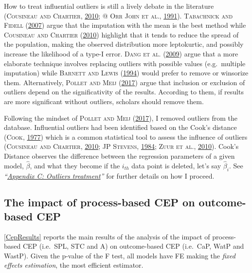 \documentclass[12pt,]{article}
\begin{document}
How to treat influential outliers is still a lively debate in the
literature (\textsc{Cousineau and Chartier},
\protect\hyperlink{ref-Cousineau2010}{2010}; @ \textsc{Orr John et al.},
\protect\hyperlink{ref-OrrJohn1991}{1991}). \textsc{Tabachnick and
Fidell} (\protect\hyperlink{ref-Tabachnick2007}{2007}) argue that the
imputation with the mean is the best method while \textsc{Cousineau and
Chartier} (\protect\hyperlink{ref-Cousineau2010}{2010}) highlight that
it tends to reduce the spread of the population, making the observed
distribution more leptokurtic, and possibly increase the likelihood of a
type-I error. \textsc{Dang et al.}
(\protect\hyperlink{ref-Dang2009}{2009}) argue that a more elaborate
technique involves replacing outliers with possible values
(e.g.~multiple imputation) while \textsc{Barnett and Lewis}
(\protect\hyperlink{ref-Barnett1994}{1994}) would prefer to remove or
winsorize them. Alternatively, \textsc{Pollet and Meij}
(\protect\hyperlink{ref-Pollet2017}{2017}) argue that inclusion or
exclusion of outliers depend on the significativity of the results.
According to them, if results are more significant without outliers,
scholars should remove them.

Following the mindset of \textsc{Pollet and Meij}
(\protect\hyperlink{ref-Pollet2017}{2017}), I removed outliers from the
database. Influential outliers had been identified based on the Cook's
distance (\textsc{Cook}, \protect\hyperlink{ref-Cook1977}{1977}) which
is a common statistical tool to assess the influence of outliers
(\textsc{Cousineau and Chartier},
\protect\hyperlink{ref-Cousineau2010}{2010}; \textsc{JP Stevens},
\protect\hyperlink{ref-JPStevens1984}{1984}; \textsc{Zuur et al.},
\protect\hyperlink{ref-Zuurprotocoldataexploration2010}{2010}). Cook's
Distance observes the difference between the regression parameters of a
given model, \(\hat{\beta}\), and what they become if the \(i_{th}\)
data point is deleted, let's say \(\hat{\beta}_{i}\). See
\emph{``\protect\hyperlink{appendix-c-outliers-treatment}{Appendix C:
Outliers treatment}''} for further details on how I proceed.

\subsection{The impact of process-based CEP on outcome-based
CEP}\label{the-impact-of-process-based-cep-on-outcome-based-cep}

\autoref{CepResults} reports the main results of the analysis of the
impact of process-based CEP (i.e.~SPL, STC and A) on outcome-based CEP
(i.e.~CaP, WatP and WastP). Given the p-value of the F test, all models
have FE making the \emph{fixed effects estimation}, the most efficient
estimator.
\end{document}
